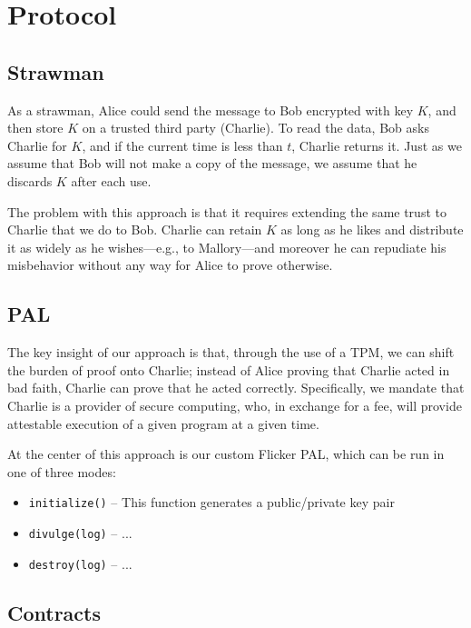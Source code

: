 \documentclass{article}
\begin{document}
\section{Protocol}

\subsection{Strawman}

As a strawman, Alice could send the message to Bob encrypted with key $K$, and then store $K$ on a trusted third party (Charlie). To read the data, Bob asks Charlie for $K$, and if the current time is less than $t$, Charlie returns it. Just as we assume that Bob will not make a copy of the message, we assume that he discards $K$ after each use.

The problem with this approach is that it requires extending the same trust to Charlie that we do to Bob. Charlie can retain $K$ as long as he likes and distribute it as widely as he wishes---e.g., to Mallory---and moreover he can repudiate his misbehavior without any way for Alice to prove otherwise.

\subsection{PAL}

The key insight of our approach is that, through the use of a TPM, we can shift the burden of proof onto Charlie; instead of Alice proving that Charlie acted in bad faith, Charlie can prove that he acted correctly. Specifically, we mandate that Charlie is a provider of secure computing, who, in exchange for a fee, will provide attestable execution of a given program at a given time.

At the center of this approach is our custom Flicker PAL, which can be run in one of three modes:

\begin{itemize}
\item \texttt{initialize()} -- This function generates a public/private key pair
\item \texttt{divulge(log)} -- ...
\item \texttt{destroy(log)} -- ...
\end{itemize}

\subsection{Contracts}
\end{document}
